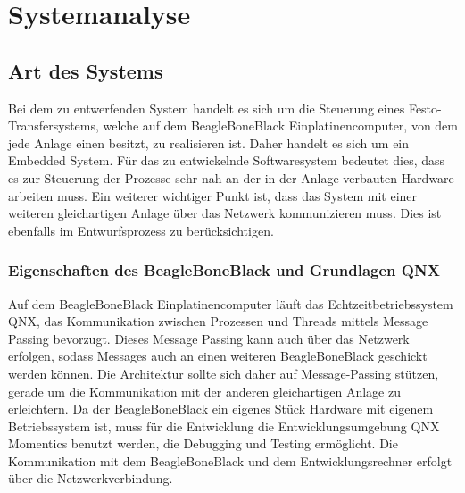 




















\section{Systemanalyse}\label{sec:systemanalyse}


\subsection{Art des Systems}

Bei dem zu entwerfenden System handelt es sich um die Steuerung eines Festo-Transfersystems,
welche auf dem BeagleBoneBlack Einplatinencomputer, von dem jede Anlage einen besitzt, zu realisieren ist.
Daher handelt es sich um ein Embedded System.
Für das zu entwickelnde Softwaresystem bedeutet dies, dass es zur Steuerung der Prozesse sehr nah
an der in der Anlage verbauten Hardware arbeiten muss.
Ein weiterer wichtiger Punkt ist, dass das System mit einer weiteren gleichartigen Anlage über
das Netzwerk kommunizieren muss. Dies ist ebenfalls im Entwurfsprozess zu berücksichtigen.

\subsubsection{Eigenschaften des BeagleBoneBlack und Grundlagen QNX}

Auf dem BeagleBoneBlack Einplatinencomputer läuft das Echtzeitbetriebssystem QNX, das Kommunikation
zwischen Prozessen und Threads mittels Message Passing bevorzugt.
Dieses Message Passing kann auch über das Netzwerk erfolgen, sodass Messages auch an
einen weiteren BeagleBoneBlack geschickt werden können.
Die Architektur sollte sich daher auf Message-Passing stützen, gerade um die Kommunikation mit der
anderen gleichartigen Anlage zu erleichtern.
Da der BeagleBoneBlack ein eigenes Stück Hardware mit eigenem Betriebssystem ist, muss für die
Entwicklung die Entwicklungsumgebung QNX Momentics benutzt werden, die Debugging und Testing ermöglicht.
Die Kommunikation mit dem BeagleBoneBlack und dem Entwicklungsrechner erfolgt über die Netzwerkverbindung.


